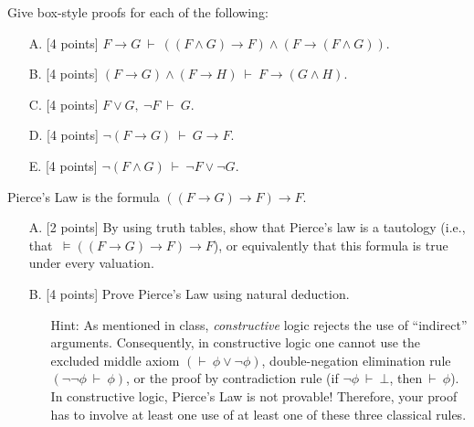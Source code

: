 \documentclass[12pt,letterpaper,boxed,cm]{hmcpset}
\newcommand{\pn}[1]{\left( #1 \right)}
\newcommand{\ra}[0]{\rightarrow}
\newcommand{\cp}[0]{~\vdash~}
\begin{document}

\begin{problem}[1]
    [20 points] Give box-style proofs for each of the following:
    \begin{enumerate}
        \item [A.] [4 points] $F \ra G \cp \pn{\pn{F \land G} \ra F} \land \pn{F \ra \pn{F \land G}}.$
        \item [B.] [4 points] $\pn{F \ra G} \land \pn{F \ra H} \cp F \ra \pn{G \land H}.$
        \item [C.] [4 points] $F \lor G, ~\neg F \cp G.$
        \item [D.] [4 points] $\neg\pn{F \ra G} \cp G \ra F.$
        \item [E.] [4 points] $\neg\pn{F \land G} \cp \neg F \lor \neg G.$
    \end{enumerate}
\end{problem}

\begin{solution}
    \vfill
\end{solution}
\newpage

\begin{problem}[2]
    [6 points] Pierce's Law is the formula $\pn{\pn{F \ra G} \ra F} \ra F.$
    \begin{enumerate}
        \item [A.] [2 points] By using truth tables, show that Pierce's law is a tautology (i.e., that  $~\vDash \pn{\pn{F \ra G} \ra F} \ra F$), or equivalently that this formula is true under every valuation.
        \item [B.] [4 points] Prove Pierce's Law using natural deduction.
        \begin{itemize}
            \item [] Hint: As mentioned in class, \textit{constructive} logic rejects the use of “indirect” arguments. Consequently, in constructive logic one cannot use the excluded middle axiom $\pn{\vdash~\phi\lor\neg\phi}$, double-negation elimination rule $\pn{\neg\neg\phi \cp\phi} $, or the proof by contradiction rule (if $\neg\phi\cp\bot$, then$\cp\phi$). In constructive logic, Pierce's Law is not provable!  Therefore, your proof has to involve at least one use of at least one of these three classical rules.
        \end{itemize}
    \end{enumerate}
    
\end{problem}
\end{document}
